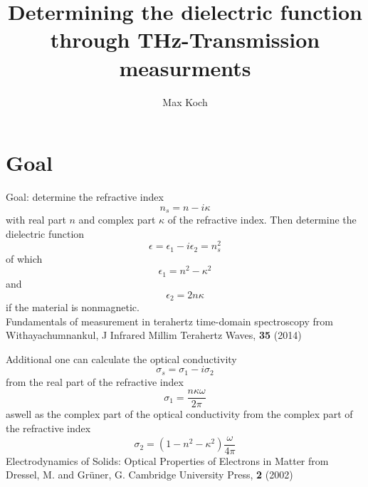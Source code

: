 \documentclass[aspectratio=1610, 9pt]{beamer}
\title{Determining the dielectric function through THz-Transmission measurments}
\author[M.~Koch]{Max Koch}
\institute[AG Wang]{Group Wang \\  faculty Physics}
\begin{document}
\maketitle

\section{Goal}
\begin{frame}
Goal: determine the refractive index \
\begin{equation}
  n_s = n - i\kappa
\end{equation}
with real part $n$ and complex part $\kappa$ of the refractive index.
Then determine the dielectric function 
\begin{equation}
  \epsilon = \epsilon_1 - i\epsilon_2 = n_s ^2
\end{equation}
of which
\begin{equation}
  \epsilon_1 = n^2 - \kappa^2
\end{equation}
and 
\begin{equation}
  \epsilon_2  = 2n\kappa 
\end{equation}
if the material is nonmagnetic.\\
\textcolor{tugreen}{Fundamentals of measurement in terahertz time-domain spectroscopy} from Withayachumnankul, J Infrared Millim Terahertz Waves, \textbf{35} (2014) 
\end{frame}

\begin{frame}
  Additional one can calculate the optical conductivity \
  \begin{equation}
    \sigma_s  = \sigma_1 - i \sigma_2 
  \end{equation}
  from the real part of the refractive index 
  \begin{equation}
    \sigma_1 = \frac{n \kappa \omega}{2\pi}
  \end{equation}
  aswell as the complex part of the optical conductivity from the complex part of the refractive index
  \begin{equation}
    \sigma_2 = \left( 1 - n^2 - \kappa^2\right) \frac{\omega}{4\pi}
  \end{equation}
  \textcolor{tugreen}{Electrodynamics of Solids: Optical Properties of Electrons in Matter} from Dressel, M. and Grüner, G. Cambridge University Press, \textbf{2} (2002) 
\end{frame}
\end{document}
